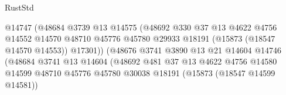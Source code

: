 \begin{lexlean}{RustStd}
\begin{coremodule}
                                                @14747
                                                (@48684
                                                  @3739
                                                  @13
                                                  @14575
                                                  (@48692
                                                    @330
                                                    @37
                                                    @13
                                                    @4622
                                                    @4756
                                                    @14552
                                                    @14570
                                                    @48710
                                                    @45776
                                                    @45780
                                                    @29933
                                                    @18191
                                                    (@15873 (@18547 @14570 @14553))
                                                    @17301))
                                                (@48676
                                                  @3741
                                                  @3890
                                                  @13
                                                  @21
                                                  @14604
                                                  @14746
                                                  (@48684
                                                    @3741
                                                    @13
                                                    @14604
                                                    (@48692
                                                      @481
                                                      @37
                                                      @13
                                                      @4622
                                                      @4756
                                                      @14580
                                                      @14599
                                                      @48710
                                                      @45776
                                                      @45780
                                                      @30038
                                                      @18191
                                                      (@15873 (@18547 @14599 @14581))

\end{coremodule}
\end{lexlean}
